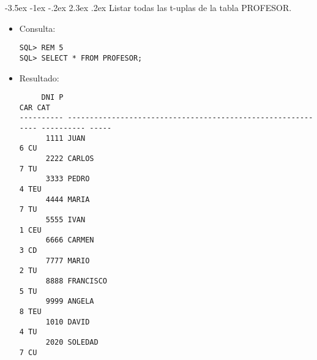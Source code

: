 \documentclass[11pt]{report}
\makeatletter
\renewcommand\chapter{\@startsection{chapter}{0}{\z@}%
    {-3.5ex \@plus -1ex \@minus -.2ex}%
    {2.3ex \@plus.2ex}%
    {\normalfont\Large\bfseries}}
\makeatother
\begin{document}
\chapter{Listar todas las t-uplas de la tabla PROFESOR.}
\begin{itemize}
  \item Consulta:
  \begin{verbatim}
SQL> REM 5
SQL> SELECT * FROM PROFESOR;
  \end{verbatim}
  \item{Resultado:}
  \begin{verbatim}
     DNI P                                                                     CAR CAT                                                                                                                  
---------- ------------------------------------------------------------ ---------- -----                                                                                                                
      1111 JUAN                                                                  6 CU                                                                                                                   
      2222 CARLOS                                                                7 TU                                                                                                                   
      3333 PEDRO                                                                 4 TEU                                                                                                                  
      4444 MARIA                                                                 7 TU                                                                                                                   
      5555 IVAN                                                                  1 CEU                                                                                                                  
      6666 CARMEN                                                                3 CD                                                                                                                   
      7777 MARIO                                                                 2 TU                                                                                                                   
      8888 FRANCISCO                                                             5 TU                                                                                                                   
      9999 ANGELA                                                                8 TEU                                                                                                                  
      1010 DAVID                                                                 4 TU                                                                                                                   
      2020 SOLEDAD                                                               7 CU                                                                                                                   


\end{verbatim}
\end{itemize}
\end{document}
